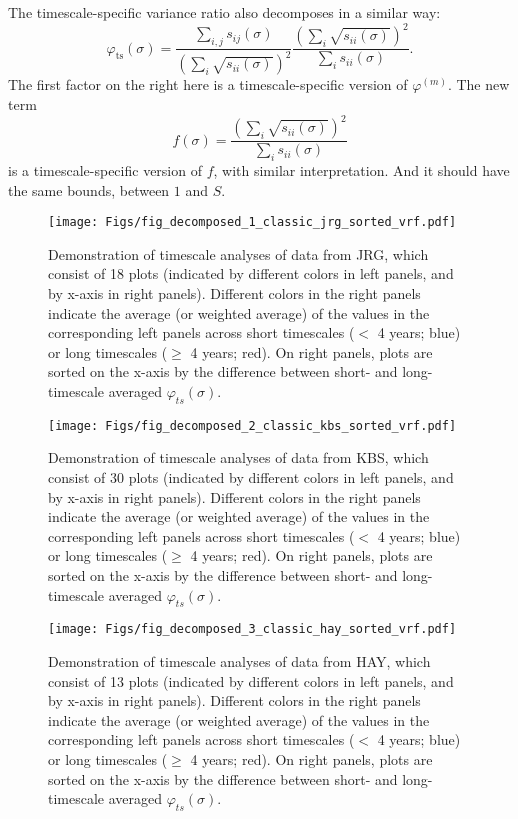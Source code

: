 \documentclass[letterpaper,11pt]{article}
\begin{document}
The timescale-specific variance ratio also decomposes in a similar way:
\begin{equation}
\varphi_{\text{ts}}(\sigma)=\frac{\sum_{i,j}s_{ij}(\sigma)}{(\sum_i \sqrt{s_{ii}(\sigma)})^2}
\frac{(\sum_i \sqrt{s_{ii}(\sigma)})^2}{\sum_i s_{ii}(\sigma)}.
\end{equation}
The first factor on the right here is a timescale-specific version of 
$\varphi^{(m)}$. The new term
\begin{equation}
f(\sigma)=\frac{(\sum_i \sqrt{s_{ii}(\sigma)})^2}{\sum_i s_{ii}(\sigma)}
\end{equation}
is a timescale-specific version of $f$, with similar interpretation.
And it should have the same bounds, between $1$ and $S$.

\newpage
\clearpage



\begin{figure}
\texttt{[image: Figs/fig\_decomposed\_1\_classic\_jrg\_sorted\_vrf.pdf]}
\caption{Demonstration of timescale analyses of data from JRG, which consist of 18 plots (indicated by different colors in left panels, and by x-axis in right panels). Different colors in the right panels indicate the average (or weighted average) of the values in the corresponding left panels across short timescales ($<$ 4 years; blue) or long timescales ($\geq$ 4 years; red). On right panels, plots are sorted on the x-axis by the difference between short- and long-timescale averaged $\varphi _{ts} (\sigma)$.}
\end{figure}

\begin{figure}
\texttt{[image: Figs/fig\_decomposed\_2\_classic\_kbs\_sorted\_vrf.pdf]}
\caption{Demonstration of timescale analyses of data from KBS, which consist of 30 plots (indicated by different colors in left panels, and by x-axis in right panels). Different colors in the right panels indicate the average (or weighted average) of the values in the corresponding left panels across short timescales ($<$ 4 years; blue) or long timescales ($\geq$ 4 years; red). On right panels, plots are sorted on the x-axis by the difference between short- and long-timescale averaged $\varphi _{ts} (\sigma)$.}
\end{figure}

\begin{figure}
\texttt{[image: Figs/fig\_decomposed\_3\_classic\_hay\_sorted\_vrf.pdf]}
\caption{Demonstration of timescale analyses of data from HAY, which consist of 13 plots (indicated by different colors in left panels, and by x-axis in right panels). Different colors in the right panels indicate the average (or weighted average) of the values in the corresponding left panels across short timescales ($<$ 4 years; blue) or long timescales ($\geq$ 4 years; red). On right panels, plots are sorted on the x-axis by the difference between short- and long-timescale averaged $\varphi _{ts} (\sigma)$.}
\end{figure}
\end{document}
